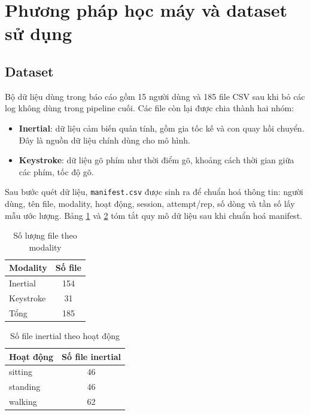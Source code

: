 \documentclass[12pt,a4paper]{article}
\begin{document}
\section{Phương pháp học máy và dataset sử dụng}

\subsection{Dataset}

Bộ dữ liệu dùng trong báo cáo gồm 15 người dùng và 185 file CSV sau khi bỏ các log không dùng trong pipeline cuối. Các file còn lại được chia thành hai nhóm:

\begin{itemize}
    \item \textbf{Inertial}: dữ liệu cảm biến quán tính, gồm gia tốc kế và con quay hồi chuyển. Đây là nguồn dữ liệu chính dùng cho mô hình.
    \item \textbf{Keystroke}: dữ liệu gõ phím như thời điểm gõ, khoảng cách thời gian giữa các phím, tốc độ gõ.
\end{itemize}

Sau bước quét dữ liệu, \texttt{manifest.csv} được sinh ra để chuẩn hoá thông tin: người dùng, tên file, modality, hoạt động, session, attempt/rep, số dòng và tần số lấy mẫu ước lượng. Bảng \ref{tab:modality-counts} và \ref{tab:activity-counts} tóm tắt quy mô dữ liệu sau khi chuẩn hoá manifest.

\begin{table}[H]
    \centering
    \caption{Số lượng file theo modality}
    \label{tab:modality-counts}
    \begin{tabular}{lc}
        \toprule
        Modality & Số file \\
        \midrule
        Inertial & 154 \\
        Keystroke & 31 \\
        \midrule
        Tổng & 185 \\
        \bottomrule
    \end{tabular}
\end{table}

\begin{table}[H]
    \centering
    \caption{Số file inertial theo hoạt động}
    \label{tab:activity-counts}
    \begin{tabular}{lc}
        \toprule
        Hoạt động & Số file inertial \\
        \midrule
        sitting & 46 \\
        standing & 46 \\
        walking & 62 \\
        \bottomrule
    \end{tabular}
\end{table}
\end{document}
